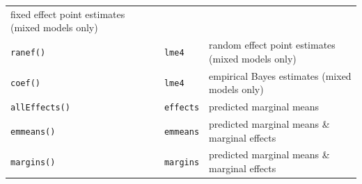 \documentclass[
]{book}
\begin{document}
\begin{longtable}[]{@{}lll@{}}
\begin{minipage}[t]{0.59\columnwidth}
fixed effect point estimates (mixed models only)\strut
\end{minipage}\tabularnewline
\begin{minipage}[t]{0.16\columnwidth}\raggedright
\texttt{ranef()}\strut
\end{minipage} & \begin{minipage}[t]{0.17\columnwidth}\raggedright
\texttt{lme4}\strut
\end{minipage} & \begin{minipage}[t]{0.59\columnwidth}\raggedright
random effect point estimates (mixed models only)\strut
\end{minipage}\tabularnewline
\begin{minipage}[t]{0.16\columnwidth}\raggedright
\texttt{coef()}\strut
\end{minipage} & \begin{minipage}[t]{0.17\columnwidth}\raggedright
\texttt{lme4}\strut
\end{minipage} & \begin{minipage}[t]{0.59\columnwidth}\raggedright
empirical Bayes estimates (mixed models only)\strut
\end{minipage}\tabularnewline
\begin{minipage}[t]{0.16\columnwidth}\raggedright
\texttt{allEffects()}\strut
\end{minipage} & \begin{minipage}[t]{0.17\columnwidth}\raggedright
\texttt{effects}\strut
\end{minipage} & \begin{minipage}[t]{0.59\columnwidth}\raggedright
predicted marginal means\strut
\end{minipage}\tabularnewline
\begin{minipage}[t]{0.16\columnwidth}\raggedright
\texttt{emmeans()}\strut
\end{minipage} & \begin{minipage}[t]{0.17\columnwidth}\raggedright
\texttt{emmeans}\strut
\end{minipage} & \begin{minipage}[t]{0.59\columnwidth}\raggedright
predicted marginal means \& marginal effects\strut
\end{minipage}\tabularnewline
\begin{minipage}[t]{0.16\columnwidth}\raggedright
\texttt{margins()}\strut
\end{minipage} & \begin{minipage}[t]{0.17\columnwidth}\raggedright
\texttt{margins}\strut
\end{minipage} & \begin{minipage}[t]{0.59\columnwidth}\raggedright
predicted marginal means \& marginal effects\strut
\end{minipage}\tabularnewline
\bottomrule
\end{longtable}
\end{document}
